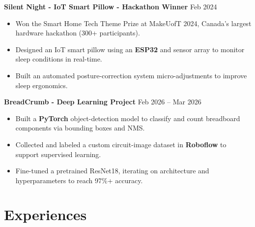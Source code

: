 \documentclass[10pt,letterpaper]{article}
\begin{document}
\textbf{Silent Night - IoT Smart Pillow - Hackathon Winner} \hfill Feb 2024 \\
\begin{itemize}
    \item Won the Smart Home Tech Theme Prize at MakeUofT 2024, Canada's largest hardware hackathon (300+ participants).  
    \item Designed an IoT smart pillow using an \textbf{ESP32} and sensor array to monitor sleep conditions in real-time.
    \item Built an automated posture-correction system micro-adjustments to improve sleep ergonomics. 
\end{itemize}

\textbf{BreadCrumb - Deep Learning Project} \hfill Feb 2026 -- Mar 2026 \\
\begin{itemize}
    \item Built a \textbf{PyTorch} object-detection model to classify and count breadboard components via bounding boxes and NMS.
    \item Collected and labeled a custom circuit-image dataset in \textbf{Roboflow} to support supervised learning.
    \item Fine-tuned a pretrained ResNet18, iterating on architecture and hyperparameters to reach 97\%+ accuracy.
\end{itemize}









\section{Experiences}
\end{document}
